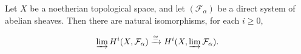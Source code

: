 Let $X$ be a noetherian topological space, and let $(\mathcal{F}_\alpha)$ be a direct system of abelian sheaves. Then there are natural isomorphisms, for each $i \geq 0$,

$$\varinjlim H^i(X, \mathcal{F}_\alpha) \xrightarrow{\cong} H^i(X, \varinjlim \mathcal{F}_\alpha).$$
